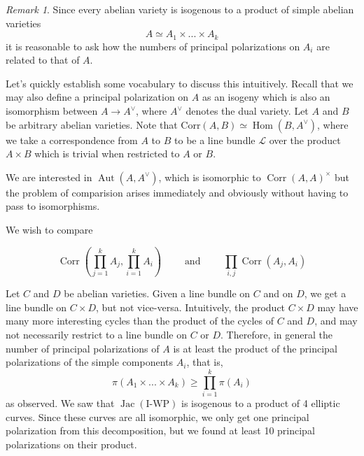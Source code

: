 \documentclass[12pt,reqno]{amsart}
\DeclareMathOperator{\Aut}{Aut}
\DeclareMathOperator{\Hom}{Hom}
\DeclareMathOperator{\Jac}{Jac}
\DeclareMathOperator{\Corr}{Corr}
\theoremstyle{definition}
\theoremstyle{remark}
\newtheorem*{remark}{Remark}
\newcommand{\ti}{\todo[inline]}
\begin{document}
\begin{remark} Since every abelian variety is isogenous to a product of simple abelian varieties $$A \simeq A_1 \times ... \times A_k$$ it is reasonable to ask how the numbers of principal polarizations on $A_i$ are related to that of $A$. 

Let's quickly establish some vocabulary to discuss this intuitively. Recall that we may also define a principal polarization on $A$ as an isogeny which is also an isomorphism between $A \to A^\vee$, where $A^\vee$ denotes the dual variety. Let $A$ and $B$ be arbitrary abelian varieties. Note that $\text{Corr}(A, B) \simeq \Hom(B, A^\vee)$, where we take a correspondence from $A$ to $B$ to be a line bundle $\mathcal{L}$ over the product $A \times B$ which is trivial when restricted to $A$ or $B$.

We are interested in $\Aut(A, A^\vee)$, which is isomorphic to $\Corr(A, A)^\times$ but the problem of comparision arises immediately and obviously without having to pass to isomorphisms. %

We wish to compare

$$\Corr\left(\prod_{j= 1}^k A_j, \prod_{i= 1}^k A_i\right) \qquad \text{ and  } \qquad \prod_{i, j} \Corr(A_j, A_i)$$

Let $C$ and $D$ be abelian varieties. Given a line bundle on $C$ and on $D$, we get a line bundle on $C \times D$, but not vice-versa. Intuitively, the product $C \times D$ may have many more interesting cycles than the product of the cycles of $C$ and $D$, and may not necessarily restrict to a line bundle on $C$ or $D$. Therefore, in general the number of principal polarizations of $A$ is at least the product of the principal polarizations of the simple components $A_i$, that is, $$\pi(A_1 \times ... \times A_k) \geq \prod_{i=1}^k \pi(A_i)$$ as observed. We saw that $\Jac(\text{I-WP})$ is isogenous to a product of 4 elliptic curves. Since these curves are all isomorphic, we only get one principal polarization from this decomposition, but we found at least 10 principal polarizations on their product.
\end{remark} 



\end{document}
